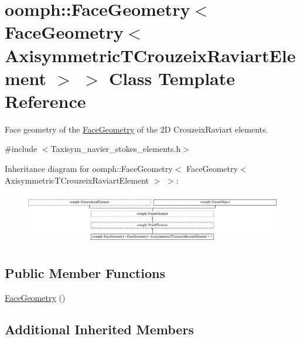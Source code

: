 \hypertarget{classoomph_1_1FaceGeometry_3_01FaceGeometry_3_01AxisymmetricTCrouzeixRaviartElement_01_4_01_4}{}\section{oomph\+:\+:Face\+Geometry$<$ Face\+Geometry$<$ Axisymmetric\+T\+Crouzeix\+Raviart\+Element $>$ $>$ Class Template Reference}
\label{classoomph_1_1FaceGeometry_3_01FaceGeometry_3_01AxisymmetricTCrouzeixRaviartElement_01_4_01_4}


Face geometry of the \hyperlink{classoomph_1_1FaceGeometry}{Face\+Geometry} of the 2D Crouzeix\+Raviart elements.  




{\ttfamily \#include $<$Taxisym\+\_\+navier\+\_\+stokes\+\_\+elements.\+h$>$}

Inheritance diagram for oomph\+:\+:Face\+Geometry$<$ Face\+Geometry$<$ Axisymmetric\+T\+Crouzeix\+Raviart\+Element $>$ $>$\+:\begin{figure}[H]
\begin{center}
\leavevmode
\includegraphics[height=2.276423cm]{classoomph_1_1FaceGeometry_3_01FaceGeometry_3_01AxisymmetricTCrouzeixRaviartElement_01_4_01_4}
\end{center}
\end{figure}
\subsection*{Public Member Functions}
\begin{DoxyCompactItemize}
\item 
\hyperlink{classoomph_1_1FaceGeometry_3_01FaceGeometry_3_01AxisymmetricTCrouzeixRaviartElement_01_4_01_4_a8837435e662313959c48a378eb8da77c}{Face\+Geometry} ()
\end{DoxyCompactItemize}
\subsection*{Additional Inherited Members}


